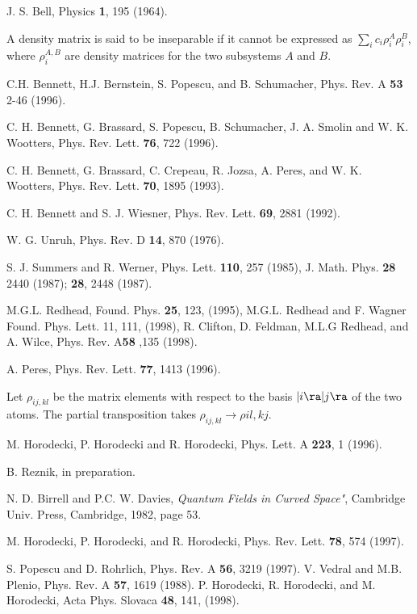 \begin{references}

 J. S. Bell,  Physics {\bf 1}, 195 (1964).

 A density matrix is said to be inseparable if it cannot be
expressed as  $\sum_i c_i\rho_i^A\rho_i^B$,
where $\rho_i^{A,B}$ are density matrices for the two subsystems $A$ and $B$.


 C.H. Bennett, H.J. Bernstein, S. Popescu,
and B.  Schumacher, Phys. Rev. A {\bf 53} 2-46 (1996).


 C. H. Bennett, G. Brassard, S. Popescu,
B. Schumacher, J. A. Smolin and W. K. Wootters, Phys. Rev. Lett. {\bf 76},
722 (1996).

 C. H. Bennett, G. Brassard, C. Crepeau, R. Jozsa,
A. Peres, and W. K. Wootters, Phys. Rev. Lett. {\bf 70}, 1895 (1993).

 C. H. Bennett and S. J. Wiesner, Phys. Rev.
Lett. {\bf 69}, 2881 (1992).



 W. G. Unruh, Phys. Rev. D {\bf 14}, 870 (1976).

 S. J. Summers and R. Werner, Phys. Lett. {\bf 110},
257 (1985),  J. Math. Phys. {\bf 28}
2440 (1987); {\bf 28}, 2448 (1987).


 M.G.L. Redhead, Found. Phys. {\bf 25}, 123, (1995),
   M.G.L. Redhead and F. Wagner
   Found. Phys. Lett. {\bf} 11, 111,  (1998),
   R. Clifton, D. Feldman, M.L.G Redhead, and A. Wilce,
   Phys. Rev.  A{\bf 58} ,135  (1998).

 A. Peres, Phys. Rev. Lett. {\bf 77}, 1413 (1996).

 Let $\rho_{ij,kl}$ be the matrix
elements  with respect to the basis $|i\ra|j\ra$
of the two atoms.
The partial transposition takes
$\rho_{ij,kl}\to \rho{il,kj}$.



 M. Horodecki, P. Horodecki and R. Horodecki, Phys. Lett. A {\bf
223}, 1 (1996).


 B. Reznik, in preparation.

 N. D. Birrell and P.C. W. Davies,
{\em Quantum Fields in Curved Space"}, Cambridge Univ. Press, Cambridge,
1982, page 53.

 M. Horodecki, P. Horodecki, and R. Horodecki, Phys. Rev.
Lett. {\bf 78}, 574 (1997).


 S. Popescu and D. Rohrlich, Phys. Rev. {A} {\bf 56},
3219 (1997).
 V. Vedral and M.B. Plenio, Phys. Rev. A {\bf 57}, 1619 (1988).
P. Horodecki, R. Horodecki, and M. Horodecki,
    Acta  Phys. Slovaca {\bf 48}, 141, (1998).

\end{references}




